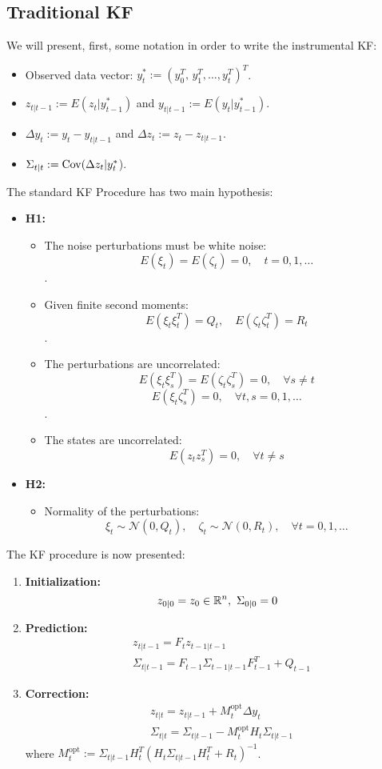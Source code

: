 \subsection{Traditional KF}
We will present, first, some notation in order to write the instrumental KF:
\begin{itemize}
  \item Observed data vector: $y^*_t:=(y_0^T,\,y_1^T,\dots,y_t^T)^T$.
  \item $z_{t|t-1}:=E(z_t|y^*_{t-1})$ and $y_{t|t-1}:=E(y_t|y^*_{t-1})$.
  \item $\Delta y_t:=y_t-y_{t|t-1}$ and $\Delta z_t:=z_t-z_{t|t-1}$.
  \item $\Sigma_{t|t}:={\rm Cov}(\Delta z_t|y_t^*$).
\end{itemize}
The standard KF
Procedure \cite{kalman1960new} has two main hypothesis:\\
\begin{itemize}
  \item \textbf{H1: }\begin{itemize}
    \item The noise perturbations must be white noise: \[E(\xi_t)=E(\zeta_t)=0, \quad t=0,1,\ldots\].
    \item Given finite second moments: \[E(\xi_t\xi_t^T)=Q_t, \quad E(\zeta_t\zeta_t^T)=R_t\].
    \item The perturbations are uncorrelated: \[E(\xi_t\xi_s^T)=E(\zeta_t\zeta_s^T)=0,\quad\forall s\neq t\]\[E(\xi_t\zeta_s^T)=0, \quad \forall t,s=0,1,\ldots\].
    \item The states are uncorrelated:
    \[E(z_tz_s^T)=0,\quad\forall t\neq s\]
  \end{itemize}
  \item \textbf{H2: }
  \begin{itemize}
    \item Normality of the perturbations:
    \[\xi_t\sim\mathcal{N}(0,Q_t),\quad\zeta_t\sim\mathcal{N}(0,R_t),\quad\forall t=0,1,\ldots\]
  \end{itemize}
\end{itemize}
The KF procedure is now presented:
\begin{enumerate}
  \item \textbf{Initialization: }
  \[
  z_{0|0}=z_0\in\R^n, \ \Sigma_{0|0}=0
  \]
  \item \textbf{Prediction: }
  \[
  \begin{split}
    &z_{t|t-1}=F_tz_{t-1|t-1}\\
    &\Sigma_{t|t-1}=F_{t-1}\Sigma_{t-1|t-1}F_{t-1}^T+Q_{t-1}
  \end{split}
  \]
  \item \textbf{Correction: }
  \[
  \begin{split}
    &z_{t | t}=z_{t | t-1}+M_{t}^{\text{opt}} \Delta y_{t} \\
    &\Sigma_{t | t}=\Sigma_{t | t-1}-M_{t}^{\text{opt}} H_{t} \Sigma_{t | t-1}
  \end{split}
  \]
  where ${M_{t}^{\text {opt}}:=\Sigma_{t | t-1} H_{t}^{T}\left(H_{t} \Sigma_{t | t-1} H_{t}^{T}+R_{t}\right)^{-1}}$.
\end{enumerate}

